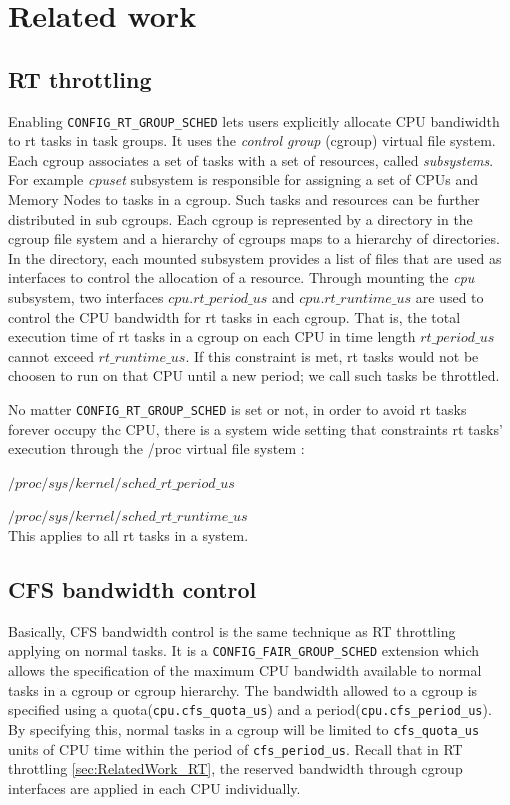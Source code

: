 \section{Related work\label{sec:RelatedWork}}
\subsection{RT throttling\label{sec:RelatedWork_RT}}
Enabling \texttt{CONFIG\_RT\_GROUP\_SCHED} lets users explicitly allocate
CPU bandiwidth to rt tasks in task groups. It uses the \emph{control group}
(cgroup) virtual file system. Each cgroup associates a set of tasks with
a set of resources, called \emph{subsystems}. For example \emph{cpuset} 
subsystem is responsible for assigning a set of CPUs and Memory Nodes to
tasks in a cgroup. Such tasks and resources can be further distributed in 
sub cgroups. Each cgroup is represented by a directory in the cgroup file 
system and a hierarchy of cgroups maps to a hierarchy of directories. In 
the directory, each mounted subsystem provides a list of files that are used 
as interfaces to control the allocation of a resource.
Through mounting the \emph{cpu} subsystem, two interfaces $cpu.rt\_period\_us$ 
and $cpu.rt\_runtime\_us$ are used to control the CPU bandwidth for rt 
tasks in each cgroup. That is, the total execution time of rt tasks in a cgroup 
on each CPU in time length $rt\_period\_us$ cannot exceed $rt\_runtime\_us$. 
If this constraint is met, rt tasks would not be choosen to run on that CPU 
until a new period; we call such tasks be throttled.

No matter \texttt{CONFIG\_RT\_GROUP\_SCHED} is set or not, in order to avoid rt 
tasks forever occupy thc CPU, there is a system wide setting that constraints
rt tasks' execution through the /proc virtual file system :

	$/proc/sys/kernel/sched\_rt\_period\_us$ 

	$/proc/sys/kernel/sched\_rt\_runtime\_us$ 
\\This applies to all rt tasks in a system.

\subsection{CFS bandwidth control\label{RelatedWork_CFS}}
Basically, CFS bandwidth control is the same technique as RT throttling
applying on normal tasks. It is a \texttt{CONFIG\_FAIR\_GROUP\_SCHED} 
extension which allows the specification of the maximum CPU bandwidth
available to normal tasks  in a cgroup or cgroup hierarchy.
The bandwidth allowed to a cgroup is specified using a 
quota(\texttt{cpu.cfs\_quota\_us}) and a period(\texttt{cpu.cfs\_period\_us}).
By specifying this, normal tasks in a cgroup will be limited to 
\texttt{cfs\_quota\_us} units of CPU time within the period of 
\texttt{cfs\_period\_us}. Recall that in RT throttling \ref{sec:RelatedWork_RT},
the reserved bandwidth through cgroup interfaces are applied in each CPU
individually.
